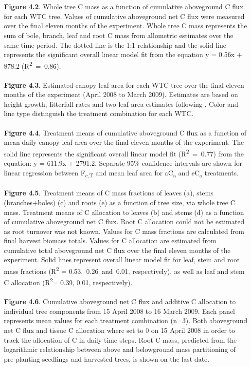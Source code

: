 \documentclass[a4paper]{article}\usepackage[]{graphicx}\usepackage[]{color}
\begin{document}
\\
\\
\textbf{Figure 4.2}. Whole tree C mass as a function of cumulative aboveground C flux for each WTC tree. Values of cumulative aboveground net C flux were measured over the final eleven months of the experiment. Whole tree C mass represents the sum of bole, branch, leaf and root C mass from allometric estimates over the same time period. The dotted line is the 1:1 relationship and the solid line represents the significant overall linear model fit from the equation y = 0.56x + 878.2 (R\textsuperscript{2}~=~0.86).
\\
\\
\textbf{Figure 4.3}. Estimated canopy leaf area for each WTC tree over the final eleven months of the experiment (April 2008 to March 2009). Estimates are based on height growth, litterfall rates and two leaf area estimates following \citet{barton2012effects}. Color and line type distinguish the treatment combination for each WTC.
\\
\\
\textbf{Figure 4.4}. Treatment means of cumulative aboveground C flux as a function of mean daily canopy leaf area over the final eleven months of the experiment. The solid line represents the significant overall linear model fit (R\textsuperscript{2}~=~0.77) from the equation: y = 611.9x + 2791.2. Separate 95\% confidence intervals are shown for linear regression between F\textsubscript{c,T} and mean leaf area for aC\textsubscript{a} and eC\textsubscript{a} treatments.
\\
\\
\textbf{Figure 4.5}. Treatment means of C mass fractions of leaves (a), stems (branches+boles) (c) and roots (e) as a function of tree size, via whole tree C mass. Treatment means of C allocation to leaves (b) and stems (d) as a function of cumulative aboveground net C flux. Root C allocation could not be estimated as root turnover was not known. Values for C mass fractions are calculated from final harvest biomass totals. Values for C allocation are estimated from cumulative total aboveground net C flux over the final eleven months of the experiment. Solid lines represent overall linear model fit for leaf, stem and root mass fractions (R\textsuperscript{2} = 0.53,~0.26~and~0.01, respectively), as well as leaf and stem C allocation (R\textsuperscript{2}= 0.39, 0.01, respectively).
\\
\\
\textbf{Figure 4.6}. Cumulative aboveground net C flux and additive C allocation to individual tree components from 15 April 2008 to 16 March 2009. Each panel represents mean values for each treatment combination (n=3). Both aboveground net C flux and tissue C allocation where set to 0 on 15 April 2008 in order to track the allocation of C in daily time steps. Root C mass, predicted from the logarithmic relationship between above and belowground mass partitioning of pre-planting seedlings and harvested trees, is shown on the last date.
\end{document}
